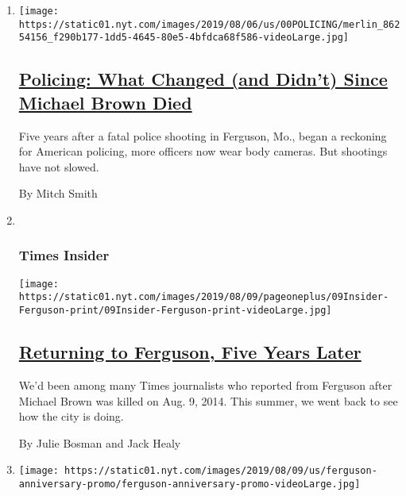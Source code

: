 \begin{enumerate}
\def\labelenumi{\arabic{enumi}.}
\item
  \texttt{[image: https://static01.nyt.com/images/2019/08/06/us/00POLICING/merlin\_86254156\_f290b177-1dd5-4645-80e5-4bfdca68f586-videoLarge.jpg]}

  \hypertarget{policing-what-changed-and-didnt-since-michael-brown-died}{%
  \subsection{\texorpdfstring{\href{/2019/08/07/us/racism-ferguson.html}{Policing:
  What Changed (and Didn't) Since Michael Brown
  Died}}{Policing: What Changed (and Didn't) Since Michael Brown Died}}\label{policing-what-changed-and-didnt-since-michael-brown-died}}

  Five years after a fatal police shooting in Ferguson, Mo., began a
  reckoning for American policing, more officers now wear body cameras.
  But shootings have not slowed.

  By Mitch Smith
\item ~
  \hypertarget{times-insider}{%
  \subsubsection{Times Insider}\label{times-insider}}

  \texttt{[image: https://static01.nyt.com/images/2019/08/09/pageoneplus/09Insider-Ferguson-print/09Insider-Ferguson-print-videoLarge.jpg]}

  \hypertarget{returning-to-ferguson-five-years-later}{%
  \subsection{\texorpdfstring{\href{/2019/08/09/reader-center/ferguson-five-years-later.html}{Returning
  to Ferguson, Five Years
  Later}}{Returning to Ferguson, Five Years Later}}\label{returning-to-ferguson-five-years-later}}

  We'd been among many Times journalists who reported from Ferguson
  after Michael Brown was killed on Aug. 9, 2014. This summer, we went
  back to see how the city is doing.

  By Julie Bosman and Jack Healy
\item
  \texttt{[image: https://static01.nyt.com/images/2019/08/09/us/ferguson-anniversary-promo/ferguson-anniversary-promo-videoLarge.jpg]}

  \hypertarget{five-years-after-michael-browns-death-his-father-wants-a-new-investigation}{%
}
\end{enumerate}
